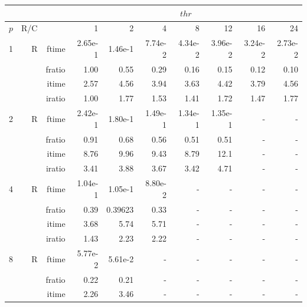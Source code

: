 \documentclass[a4paper]{article}
\begin{document}
\begin{table}[htbp]
\begin{center}
\begin{small}
\begin{tabular}{|r|r|r|r|r|r|r|r|r|r|}
\hline 
     & & & \multicolumn{7}{c|}{$thr$} \\ \hline
    $p$ & R/C &  & 1           & 2    & 4    & 8    & 12   & 16    & 24  \\ \hline\hline
   1 &  R &   ftime &    2.65e-1 &    1.46e-1 &    7.74e-2 &    4.34e-2 &    3.96e-2 &    3.24e-2 &    2.73e-2 \\
             &             &  fratio &    1.00 &    0.55 &    0.29 &    0.16 &    0.15 &    0.12 &    0.10 \\
             &             &  itime &    2.57  &    4.56  &    3.94  &    3.63  &    4.42  &    3.79  &    4.56  \\
             &             &  iratio &    1.00 &    1.77  &    1.53  &    1.41  &    1.72  &    1.47  &    1.77  \\\hline
   2 &  R &   ftime &    2.42e-1 &    1.80e-1 &    1.49e-1 &    1.34e-1 &    1.35e-1 &      - &      - \\
             &             &  fratio &    0.91 &    0.68 &    0.56 &   0.51 &   0.51 &      - &      - \\
             &             &  itime &    8.76  &    9.96  &    9.43  &    8.79  &    12.1 &     - &      - \\
             &             &  iratio &    3.41  &    3.88  &   3.67  &    3.42  &    4.71  &      - &      - \\\hline
   4 &  R &   ftime &    1.04e-1 &    1.05e-1 &    8.80e-2 &      - &      - &      - &      - \\
             &             &  fratio &    0.39 &    0.39623 &    0.33 &      - &      - &      - &      - \\
             &             &  itime &    3.68  &    5.74  &    5.71  &      - &      - &      - &      - \\
             &             &  iratio &    1.43  &    2.23  &    2.22  &      - &      - &      - &      - \\\hline
   8 &   R &   ftime &    5.77e-2 &    5.61e-2 &      - &      - &      - &      - &      - \\
             &             &  fratio &   0.22 &    0.21 &      - &      - &      - &      - &      - \\
             &             &  itime &    2.26  &    3.46  &      - &      - &      - &      - &      - \\

\end{tabular}
\end{small}
\end{center}
\end{table}
\end{document}
